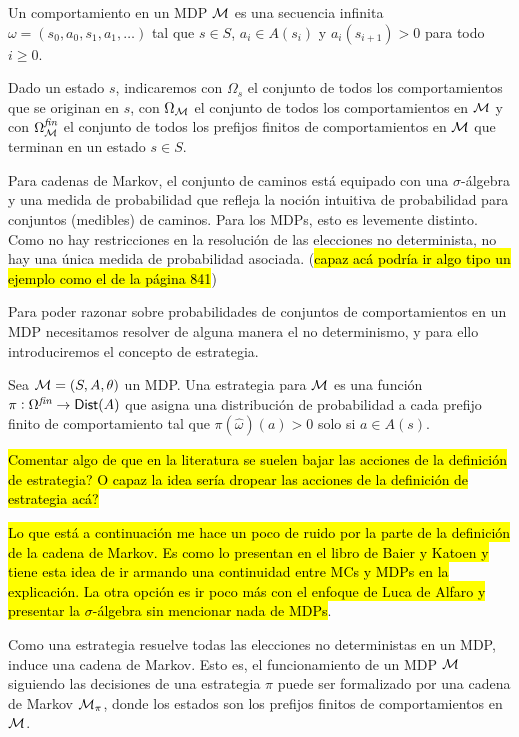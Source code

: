 \begin{definition}
	Un comportamiento en un MDP $\mathcal{M}$ es una secuencia infinita $\omega = (s_0, a_0, s_1, a_1, \dots)$ tal que $s \in S$, $a_i \in A(s_i)$ y $a_i(s_{i+1}) > 0$ para todo $i \geq 0$.

	Dado un estado $s$, indicaremos con $\Omega_s$ el conjunto de todos los
	comportamientos que se originan en $s$, con $\Omega_{\mathcal{M}}$ el conjunto de todos
	los comportamientos en $\mathcal{M}$ y con $\Omega^{\textit{fin}}_{\mathcal{M}}$ el conjunto de
	todos los prefijos finitos de comportamientos en $\mathcal{M}$ que terminan en un estado
	$s \in S$.
\end{definition}

Para cadenas de Markov, el conjunto de caminos está equipado con una
$\sigma$-álgebra y una medida de probabilidad que refleja la noción intuitiva
de probabilidad para conjuntos (medibles) de caminos. Para los MDPs, esto es
levemente distinto. Como no hay restricciones en la resolución de las
elecciones no determinista, no hay una única medida de probabilidad asociada.
(\hl{capaz acá podría ir algo tipo un ejemplo como el de la página 841})

Para poder razonar sobre probabilidades de conjuntos de comportamientos en un
MDP necesitamos resolver de alguna manera el no determinismo, y para ello
introduciremos el concepto de estrategia.

\begin{definition}
	Sea $\mathcal{M} = (S, A, \theta)$ un MDP. Una estrategia para $\mathcal{M}$ es una función $\pi: \Omega^{\textit{fin}} \rightarrow \mathsf{Dist} (A)$ que asigna una distribución de probabilidad a cada prefijo finito de comportamiento tal que $\pi(\hat \omega) (a) > 0$ solo si $a \in A(s)$.
\end{definition}

\hl{Comentar algo de que en la literatura se suelen bajar las acciones de la definición de estrategia? O capaz la idea sería dropear las acciones de la definición de estrategia acá?}

\hl{Lo que está a continuación me hace un poco de ruido por la parte de la definición de la cadena de Markov. Es como lo presentan en el libro de Baier y Katoen y tiene esta idea de ir armando una continuidad entre MCs y MDPs en la explicación. La otra opción es ir poco más con el enfoque de Luca de Alfaro y presentar la $\sigma$-álgebra sin mencionar nada de MDPs}.

Como una estrategia resuelve todas las elecciones no deterministas en un MDP,
induce una cadena de Markov. Esto es, el funcionamiento de un MDP $\mathcal{M}$
siguiendo las decisiones de una estrategia $\pi$ puede ser formalizado por una
cadena de Markov $\mathcal{M}_\pi$, donde los estados son los prefijos finitos de
comportamientos en $\mathcal{M}$.

